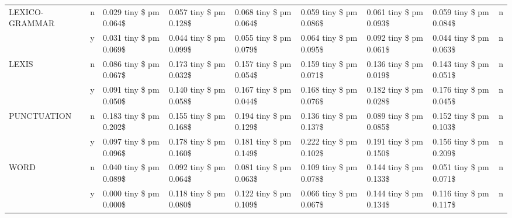 \begin{table}
\begin{tabular}{lllllllll}
\cline{1-9}
\multirow[t]{2}{*}{LEXICO-GRAMMAR} & n & 0.029 tiny \$ pm 0.064\$ & 0.057 tiny \$ pm 0.128\$ & 0.068 tiny \$ pm 0.064\$ & 0.059 tiny \$ pm 0.086\$ & 0.061 tiny \$ pm 0.093\$ & 0.059 tiny \$ pm 0.084\$ & n \\
 & y & 0.031 tiny \$ pm 0.069\$ & 0.044 tiny \$ pm 0.099\$ & 0.055 tiny \$ pm 0.079\$ & 0.064 tiny \$ pm 0.095\$ & 0.092 tiny \$ pm 0.061\$ & 0.044 tiny \$ pm 0.063\$ & n \\
\cline{1-9}
\multirow[t]{2}{*}{LEXIS} & n & 0.086 tiny \$ pm 0.067\$ & 0.173 tiny \$ pm 0.032\$ & 0.157 tiny \$ pm 0.054\$ & 0.159 tiny \$ pm 0.071\$ & 0.136 tiny \$ pm 0.019\$ & 0.143 tiny \$ pm 0.051\$ & n \\
 & y & 0.091 tiny \$ pm 0.050\$ & 0.140 tiny \$ pm 0.058\$ & 0.167 tiny \$ pm 0.044\$ & 0.168 tiny \$ pm 0.076\$ & 0.182 tiny \$ pm 0.028\$ & 0.176 tiny \$ pm 0.045\$ & n \\
\cline{1-9}
\multirow[t]{2}{*}{PUNCTUATION} & n & 0.183 tiny \$ pm 0.202\$ & 0.155 tiny \$ pm 0.168\$ & 0.194 tiny \$ pm 0.129\$ & 0.136 tiny \$ pm 0.137\$ & 0.089 tiny \$ pm 0.085\$ & 0.152 tiny \$ pm 0.103\$ & n \\
 & y & 0.097 tiny \$ pm 0.096\$ & 0.178 tiny \$ pm 0.160\$ & 0.181 tiny \$ pm 0.149\$ & 0.222 tiny \$ pm 0.102\$ & 0.191 tiny \$ pm 0.150\$ & 0.156 tiny \$ pm 0.209\$ & n \\
\cline{1-9}
\multirow[t]{2}{*}{WORD} & n & 0.040 tiny \$ pm 0.089\$ & 0.092 tiny \$ pm 0.064\$ & 0.081 tiny \$ pm 0.063\$ & 0.109 tiny \$ pm 0.078\$ & 0.144 tiny \$ pm 0.133\$ & 0.051 tiny \$ pm 0.071\$ & n \\
 & y & 0.000 tiny \$ pm 0.000\$ & 0.118 tiny \$ pm 0.080\$ & 0.122 tiny \$ pm 0.109\$ & 0.066 tiny \$ pm 0.067\$ & 0.144 tiny \$ pm 0.134\$ & 0.116 tiny \$ pm 0.117\$ & n \\
\cline{1-9}
\bottomrule
\end{tabular}
\end{table}
